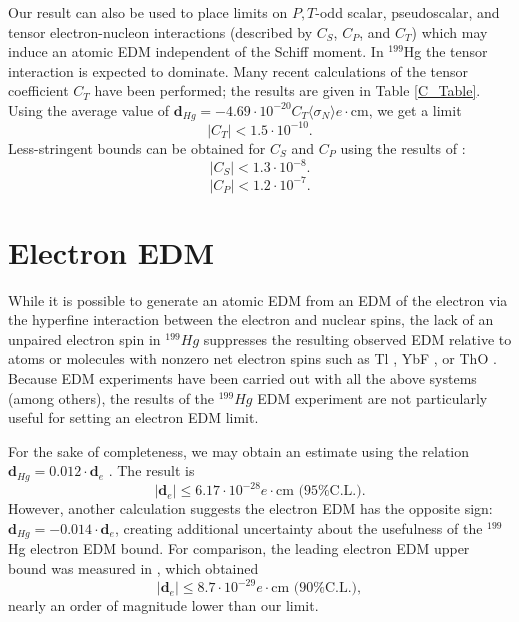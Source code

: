 \documentclass [10pt, twoside] {uwthesis}[2012/04/02]
\begin{document}
Our result can also be used to place limits on $P,T$-odd scalar, pseudoscalar, and tensor electron-nucleon interactions (described by $C_S$, $C_P$, and $C_T$) which may induce an atomic EDM independent of the Schiff moment. In $^{199}$Hg the tensor interaction is expected to dominate. Many recent calculations of the tensor coefficient $C_T$ have been performed; the results are given in Table \ref{C_Table}. Using the average value of $\mathbf{d}_{Hg} = -4.69 \cdot 10^{-20} C_T \langle\sigma_N\rangle e\cdot \text{cm}$, we get a limit 
\begin{equation}
|C_T| < 1.5\cdot 10^{-10}. 
\end{equation}
Less-stringent bounds can be obtained for $C_S$ and $C_P$ using the results of \cite{2004_Ginges_Flambaum_Fund._Symmetries_in_Atoms}:
\begin{equation}
|C_S| < 1.3 \cdot 10^{-8}. 
\end{equation}
\begin{equation}
|C_P| < 1.2 \cdot 10^{-7}.
\end{equation}

\section{Electron EDM}
While it is possible to generate an atomic EDM from an EDM of the electron via the hyperfine interaction between the electron and nuclear spins, the lack of an unpaired electron spin in $^{199}Hg$ suppresses the resulting observed EDM relative to atoms or molecules with nonzero net electron spins such as Tl \cite{2002_Tl_EDM}, YbF \cite{2011_YbF_EDM}, or ThO \cite{2014_ACME_eEDM}. Because EDM experiments have been carried out with all the above systems (among others), the results of the $^{199}Hg$ EDM experiment are not particularly useful for setting an electron EDM limit. 

For the sake of completeness, we may obtain an estimate using the relation $\mathbf{d}_{Hg} = 0.012\cdot\mathbf{d}_e$ \cite{1987_Martensson_Oster_eEDM}. The result is
\begin{equation}
|\mathbf{d}_e| \leq 6.17 \cdot 10^{-28} e\cdot\text{cm (95\% C.L.)}.
\end{equation}
However, another calculation \cite{1985_Flambaum_Khriplovich_eEDM_bound} suggests the electron EDM has the opposite sign: $\mathbf{d}_{Hg} = -0.014 \cdot\mathbf{d}_e$, creating additional uncertainty about the usefulness of the $^{199}$Hg electron EDM bound. For comparison, the leading electron EDM upper bound was measured in \cite{2014_ACME_eEDM}, which obtained
\begin{equation}
|\mathbf{d}_e| \leq 8.7 \cdot 10^{-29} e\cdot\text{cm (90\% C.L.)},
\end{equation}
nearly an order of magnitude lower than our limit.
\end{document}
